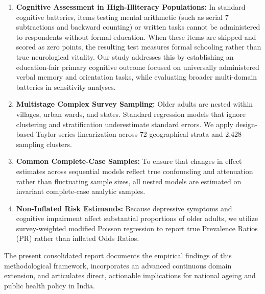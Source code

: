 \begin{enumerate}[label=\arabic*.]
    \item \textbf{Cognitive Assessment in High-Illiteracy Populations:} In standard cognitive batteries, items testing mental arithmetic (such as serial 7 subtractions and backward counting) or written tasks cannot be administered to respondents without formal education. When these items are skipped and scored as zero points, the resulting test measures formal schooling rather than true neurological vitality. Our study addresses this by establishing an education-fair primary cognitive outcome focused on universally administered verbal memory and orientation tasks, while evaluating broader multi-domain batteries in sensitivity analyses.
    \item \textbf{Multistage Complex Survey Sampling:} Older adults are nested within villages, urban wards, and states. Standard regression models that ignore clustering and stratification underestimate standard errors. We apply design-based Taylor series linearization across 72 geographical strata and 2,428 sampling clusters.
    \item \textbf{Common Complete-Case Samples:} To ensure that changes in effect estimates across sequential models reflect true confounding and attenuation rather than fluctuating sample sizes, all nested models are estimated on invariant complete-case analytic samples.
    \item \textbf{Non-Inflated Risk Estimands:} Because depressive symptoms and cognitive impairment affect substantial proportions of older adults, we utilize survey-weighted modified Poisson regression to report true Prevalence Ratios (PR) rather than inflated Odds Ratios.
\end{enumerate}

The present consolidated report documents the empirical findings of this methodological framework, incorporates an advanced continuous domain extension, and articulates direct, actionable implications for national ageing and public health policy in India.
